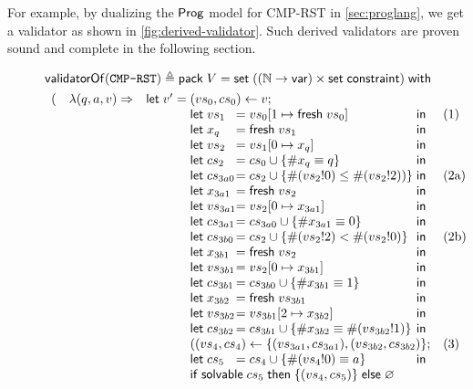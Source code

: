For example, by dualizing the $\mathsf{Prog}$ model for CMP-RST in
\autoref{sec:proglang}, we get a validator as shown in
\autoref{fig:derived-validator}.  Such derived validators are proven sound and
complete in the following section.
\begin{figure}
\begin{align*}
&\validatorOf(\texttt{CMP-RST})\triangleq\existT{V}{\Set((\Nat\to\Var)\times\Set\constraint)}\\
  &\begin{array}{rll}
     (&\lam{(q,a,v)}{&\llet v'=\begin{array}[t]{@{}l@{}l@{}ll}
       \multicolumn{3}{@{}l}{(vs_0,cs_0)\gets v;}\\
       \letin{vs_1&}{\update{vs_0}{1}{\Fresh vs_0}&}&\text{(1)}\\
       \letin{x_q&}{\Fresh vs_1&}\\
       \letin{vs_2&}{\update{vs_1}{0}{x_q}&}\\
       \letin{cs_2&}{cs_0\cup\{\#x_q\equiv q\}&}\\
       \letin{cs_{3a0}&}{cs_2\cup\{\#(vs_2!0)\le\#(vs_2!2))\}&}&\text{(2a)}\\
       \letin{x_{3a1}&}{\Fresh vs_2&}\\
       \letin{vs_{3a1}&}{\update{vs_2}{0}{x_{3a1}}&}\\
       \letin{cs_{3a1}&}{cs_{3a0}\cup\{\#x_{3a1}\equiv0\}&}\\
       \letin{cs_{3b0}&}{cs_2\cup\{\#(vs_2!2)<\#(vs_2!0)\}&}&\text{(2b)}\\
       \letin{x_{3b1}&}{\Fresh vs_2&}\\
       \letin{vs_{3b1}&}{\update{vs_2}{0}{x_{3b1}}&}\\
       \letin{cs_{3b1}&}{cs_{3b0}\cup\{\#x_{3b1}\equiv1\}&}\\
       \letin{x_{3b2}&}{\Fresh vs_{3b1}&}\\
       \letin{vs_{3b2}&}{\update{vs_{3b1}}{2}{x_{3b2}}&}\\
       \letin{cs_{3b2}&}{cs_{3b1}\cup\{\#x_{3b2}\equiv\#(vs_{3b2}!1)\}&}\\
       \multicolumn{3}{@{}l}{((vs_4,cs_4)\gets\{(vs_{3a1},cs_{3a1}),(vs_{3b2},cs_{3b2})\};}&\text{(3)}\\
       \letin{cs_5&}{cs_4\cup\{\#(vs_4!0)\equiv a\}&}\\
       \multicolumn{3}{@{}l}{\If\solvable cs_5\Then\{(vs_4,cs_5)\}\Else\varnothing}\\
       \end{array}\\
}
\end{array}
\end{align*}
\end{figure}
